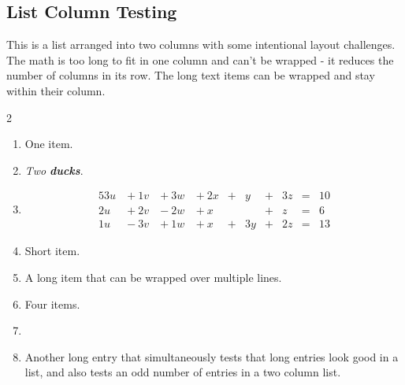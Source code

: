 \documentclass{amsart}
\theoremstyle{plain}%
\theoremstyle{definition}%
\theoremstyle{remark}%
\newcommand{\alert}[1]{\textbf{\textit{#1}}}
\numberwithin{equation}{section}
\newcommand{\amp}{&}
\begin{document}
\subsection{List Column Testing}\label{section-lists-10}%
This is a list arranged into two columns with some intentional layout challenges. The math is too long to fit in one column and can't be wrapped - it reduces the number of columns in its row. The long text items can be wrapped and stay within their column.%
\begin{multicols}{2}
\begin{enumerate}[label={(\alph*)}]
\item{}One item.%
\item{}\emph{Two} \alert{ducks}.%
\item{}%
\begin{alignat*}{5}
3u \amp {}+{} 1v \amp {}+{} 3w \amp {}+{} 2x \amp {}+{} \amp  y \amp {}+{} \amp 3z \amp {}={} \amp 10\\
2u \amp {}+{} 2v \amp {}-{} 2w \amp {}+{} x  \amp       \amp    \amp {}+{} \amp  z \amp {}={} \amp 6\\
1u \amp {}-{} 3v \amp {}+{} 1w \amp {}+{} x  \amp {}+{} \amp 3y \amp {}+{} \amp 2z \amp {}={} \amp 13
\end{alignat*}
%
\item{}Short item.%
\item{}A long item that can be wrapped over multiple lines.%
\item{}Four items.%
\item{}%
\item{}Another long entry that simultaneously tests that long entries look good in a list, and also tests an odd number of entries in a two column list.%
\end{enumerate}
\end{multicols}
%
%
%
\typeout{************************************************}
\typeout{************************************************}
%
\end{document}
